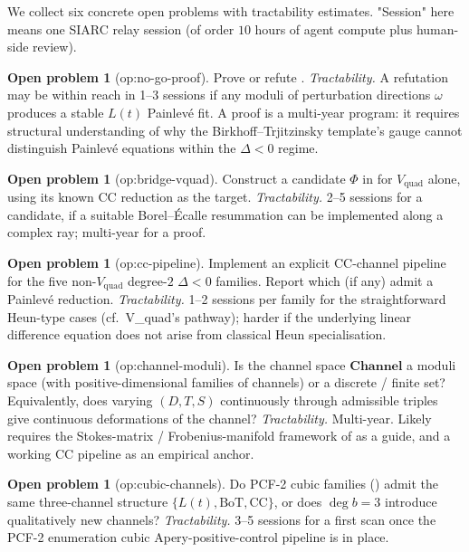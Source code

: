 \documentclass[11pt,reqno]{amsart}
\theoremstyle{plain}
\theoremstyle{definition}
\newtheorem{problem}[theorem]{Open problem}
\theoremstyle{remark}
\newcommand{\Channel}{\mathbf{Channel}}
\newcommand{\Lt}{L(t)}
\newcommand{\BoT}{\mathrm{BoT}}
\newcommand{\CC}{\mathrm{CC}}
\newcommand{\Vquad}{V_{\mathrm{quad}}}
\begin{document}
We collect six concrete open problems with tractability
estimates. "Session" here means one SIARC relay session
(of order $10$ hours of agent compute plus human-side review).

\begin{problem}[\textsf{op:no-go-proof}]
Prove or refute .
\emph{Tractability.} A refutation may be within reach in
1--3 sessions if any moduli of perturbation directions
$\omega$ produces a stable $\Lt$ Painlev\'e fit. A proof is a
multi-year program: it requires structural understanding of
why the Birkhoff--Trjitzinsky template's gauge cannot
distinguish Painlev\'e equations within the $\Delta<0$
regime.
\end{problem}

\begin{problem}[\textsf{op:bridge-vquad}]
Construct a candidate $\Phi$ in  for
$\Vquad$ alone, using its known $\CC$ reduction as the
target.
\emph{Tractability.} 2--5 sessions for a candidate, if a
suitable Borel--\'Ecalle resummation can be implemented
along a complex ray; multi-year for a proof.
\end{problem}

\begin{problem}[\textsf{op:cc-pipeline}]
Implement an explicit $\CC$-channel pipeline for the five
non-$\Vquad$ degree-$2$ $\Delta<0$ families. Report which (if
any) admit a Painlev\'e reduction.
\emph{Tractability.} 1--2 sessions per family for the
straightforward Heun-type cases (cf.\ V\_quad's
\cite{slavyanov2000special} pathway); harder if the
underlying linear difference equation does not arise from
classical Heun specialisation.
\end{problem}

\begin{problem}[\textsf{op:channel-moduli}]
Is the channel space $\Channel$ a moduli space (with
positive-dimensional families of channels) or a discrete /
finite set? Equivalently, does varying $(D,T,S)$ continuously
through admissible triples give continuous deformations of
the channel?
\emph{Tractability.} Multi-year. Likely requires the
Stokes-matrix / Frobenius-manifold framework of
\cite{boalch2001stokes} as a guide, and a working
$\CC$ pipeline as an empirical anchor.
\end{problem}

\begin{problem}[\textsf{op:cubic-channels}]
Do PCF-2 cubic families (\cite{siarc_pcf2_program}) admit the
same three-channel structure $\{\Lt, \BoT, \CC\}$, or does
$\deg b = 3$ introduce qualitatively new channels?
\emph{Tractability.} 3--5 sessions for a first scan once the
PCF-2 enumeration cubic Apery-positive-control pipeline is
in place.
\end{problem}
\end{document}
